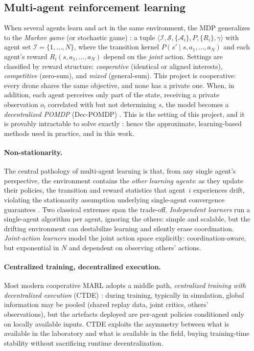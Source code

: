 \subsection{Multi-agent reinforcement learning}
\label{subsec:bg-marl}

When several agents learn and act in the same environment, the MDP generalizes to
the \emph{Markov game} (or stochastic game) \citep{littman1994markov}: a tuple
$\langle \mathcal{I}, \mathcal{S}, \{\mathcal{A}_i\}, P, \{R_i\}, \gamma \rangle$
with agent set $\mathcal{I} = \{1,\dots,N\}$, where the transition kernel
$P(s' \mid s, a_1, \dots, a_N)$ and each agent's reward $R_i(s, a_1, \dots, a_N)$
depend on the \emph{joint} action. Settings are classified by reward structure:
\emph{cooperative} (identical or aligned interests), \emph{competitive}
(zero-sum), and \emph{mixed} (general-sum). This project is cooperative: every
drone shares the same objective, and none has a private one. When, in addition,
each agent perceives only part of the state, receiving a private observation
$o_i$ correlated with but not determining $s$, the model becomes a
\emph{decentralized POMDP} (Dec-POMDP) \citep{oliehoek2016concise}. This is the
setting of this project, and it is provably intractable to solve exactly
\citep{bernstein2002complexity}: hence the approximate, learning-based methods
used in practice, and in this work.

\paragraph{Non-stationarity.}
The central pathology of multi-agent learning is that, from any single agent's
perspective, the environment contains the \emph{other learning agents}: as they
update their policies, the transition and reward statistics that agent~$i$
experiences drift, violating the stationarity assumption underlying single-agent
convergence guarantees \citep{hernandezleal2019survey}. Two classical extremes
span the trade-off. \emph{Independent learners} \citep{tan1993multi} run a
single-agent algorithm per agent, ignoring the others: simple and scalable, but
the drifting environment can destabilize learning and silently erase
coordination. \emph{Joint-action learners} model the joint action space
explicitly: coordination-aware, but exponential in $N$ and dependent on observing
others' actions.

\paragraph{Centralized training, decentralized execution.}
Most modern cooperative MARL adopts a middle path, \emph{centralized training
with decentralized execution} (CTDE) \citep{kraemer2016multi,lowe2017multi}:
during training, typically in simulation, global information may be pooled
(shared replay data, joint critics, others' observations), but the artefacts
deployed are per-agent policies conditioned only on locally available inputs.
CTDE exploits the asymmetry between what is available in the laboratory and what
is available in the field, buying training-time stability without sacrificing
runtime decentralization.

